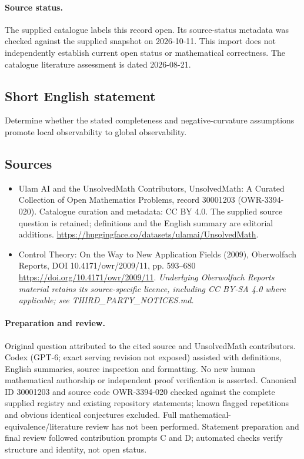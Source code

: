 \documentclass[11pt]{article}
\begin{document}
\paragraph{Source status.}
The supplied catalogue labels this record open. Its source-status metadata was checked against the supplied snapshot on 2026-10-11. This import does not independently establish current open status or mathematical correctness. The catalogue literature assessment is dated 2026-08-21.
\subsection{Short English statement}
Determine whether the stated completeness and negative-curvature assumptions promote local observability to global observability.
\subsection{Sources}
\begin{itemize}
\item[\hypertarget{source:30001203:1}{S1}] Ulam AI and the UnsolvedMath Contributors, UnsolvedMath: A Curated Collection of Open Mathematics Problems, record 30001203 (OWR-3394-020). Catalogue curation and metadata: CC BY 4.0. The supplied source question is retained; definitions and the English summary are editorial additions.
\url{https://huggingface.co/datasets/ulamai/UnsolvedMath}.
\item[\hypertarget{source:30001203:2}{S2}] Control Theory: On the Way to New Application Fields (2009), Oberwolfach Reports, DOI 10.4171/owr/2009/11, pp. 593--680
\url{https://doi.org/10.4171/owr/2009/11}.
\textit{Underlying Oberwolfach Reports material retains its source-specific licence, including CC BY-SA 4.0 where applicable; see THIRD\_PARTY\_NOTICES.md.}
\end{itemize}
\paragraph{Preparation and review.}
Original question attributed to the cited source and UnsolvedMath contributors. Codex (GPT-6; exact serving revision not exposed) assisted with definitions, English summaries, source inspection and formatting. No new human mathematical authorship or independent proof verification is asserted. Canonical ID 30001203 and source code OWR-3394-020 checked against the complete supplied registry and existing repository statements; known flagged repetitions and obvious identical conjectures excluded. Full mathematical-equivalence/literature review has not been performed. Statement preparation and final review followed contribution prompts C and D; automated checks verify structure and identity, not open status.
\label{end:30001203}
\end{document}

